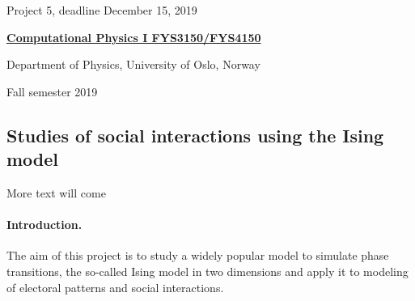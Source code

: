 \documentclass[%
oneside,                 %
final,                   %
10pt]{article}
\begin{document}

\newcommand{\exercisesection}[1]{\subsection*{#1}}






\thispagestyle{empty}

\begin{center}
{\LARGE\bf
\begin{spacing}{1.25}
Project 5, deadline  December 15, 2019
\end{spacing}
}
\end{center}


\begin{center}
{\bf \href{{http://www.uio.no/studier/emner/matnat/fys/FYS3150/index-eng.html}}{Computational Physics I FYS3150/FYS4150}}
\end{center}

    \begin{center}
\centerline{{\small Department of Physics, University of Oslo, Norway}}
\end{center}
    

\begin{center}
Fall semester 2019
\end{center}

\vspace{1cm}


\subsection{Studies of social interactions using the Ising model}

More text will come

\paragraph{Introduction.}
The aim of this project is to study a widely popular model to simulate phase transitions, the so-called Ising model in two dimensions and apply it to modeling of electoral patterns and social interactions.
\end{document}

